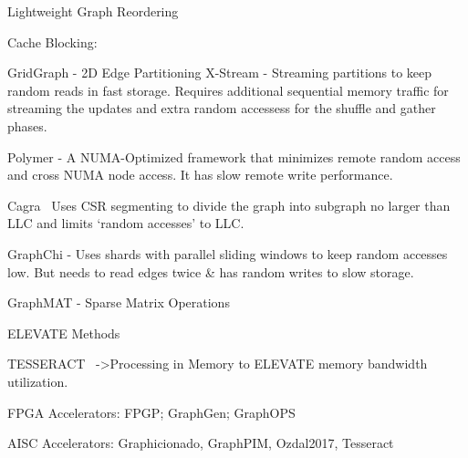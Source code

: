 Lightweight Graph Reordering ~\cite{Balaji2018}

Cache Blocking: 

GridGraph - 2D Edge Partitioning
X-Stream - Streaming partitions to keep random reads in fast storage. Requires additional sequential memory traffic for streaming the updates and extra random accessess for the shuffle and gather phases. 

Polymer - A NUMA-Optimized framework that minimizes remote random access and cross NUMA node access. It has slow remote write performance. 

Cagra~\cite{Zhang2017} Uses CSR segmenting to divide the graph into subgraph no larger than LLC and limits `random accesses' to LLC.

GraphChi - Uses shards with parallel sliding windows to keep random accesses low. But needs to read edges twice \& has random writes to slow storage. 

GraphMAT - Sparse Matrix Operations

ELEVATE Methods

TESSERACT~\cite{Ahn2015} ->Processing in Memory to ELEVATE memory bandwidth utilization.

FPGA Accelerators: FPGP; GraphGen; GraphOPS

AISC Accelerators: Graphicionado, GraphPIM, Ozdal2017, Tesseract

